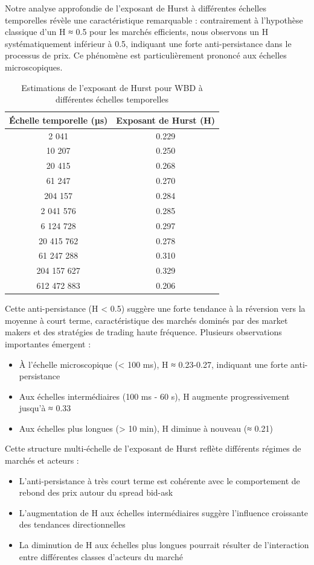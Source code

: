 \documentclass[12pt,a4paper]{article}
\theoremstyle{definition}
\theoremstyle{remark}
\begin{document}
Notre analyse approfondie de l'exposant de Hurst à différentes échelles temporelles révèle une caractéristique remarquable : contrairement à l'hypothèse classique d'un H ≈ 0.5 pour les marchés efficients, nous observons un H systématiquement inférieur à 0.5, indiquant une forte anti-persistance dans le processus de prix. Ce phénomène est particulièrement prononcé aux échelles microscopiques.

\begin{table}[h!]
\centering
\begin{tabular}{|c|c|}
\hline
\textbf{Échelle temporelle (µs)} & \textbf{Exposant de Hurst (H)} \\
\hline
2 041 & 0.229 \\
10 207 & 0.250 \\
20 415 & 0.268 \\
61 247 & 0.270 \\
204 157 & 0.284 \\
2 041 576 & 0.285 \\
6 124 728 & 0.297 \\
20 415 762 & 0.278 \\
61 247 288 & 0.310 \\
204 157 627 & 0.329 \\
612 472 883 & 0.206 \\
\hline
\end{tabular}
\caption{Estimations de l'exposant de Hurst pour WBD à différentes échelles temporelles}
\label{tab:hurst_exponents}
\end{table}

Cette anti-persistance (H < 0.5) suggère une forte tendance à la réversion vers la moyenne à court terme, caractéristique des marchés dominés par des market makers et des stratégies de trading haute fréquence. Plusieurs observations importantes émergent :

\begin{itemize}
    \item À l'échelle microscopique (< 100 ms), H ≈ 0.23-0.27, indiquant une forte anti-persistance
    \item Aux échelles intermédiaires (100 ms - 60 s), H augmente progressivement jusqu'à ≈ 0.33
    \item Aux échelles plus longues (> 10 min), H diminue à nouveau (≈ 0.21)
\end{itemize}

Cette structure multi-échelle de l'exposant de Hurst reflète différents régimes de marchés et acteurs :
\begin{itemize}
    \item L'anti-persistance à très court terme est cohérente avec le comportement de rebond des prix autour du spread bid-ask
    \item L'augmentation de H aux échelles intermédiaires suggère l'influence croissante des tendances directionnelles
    \item La diminution de H aux échelles plus longues pourrait résulter de l'interaction entre différentes classes d'acteurs du marché
\end{itemize}
\end{document}
